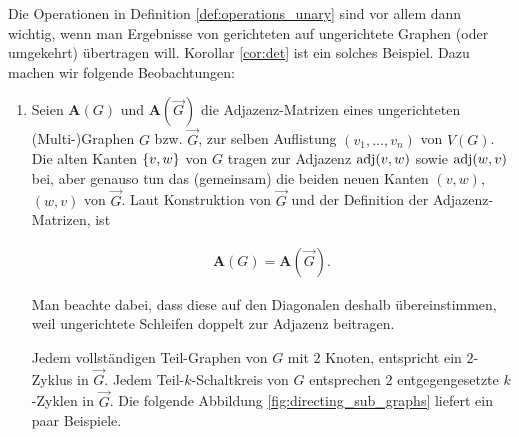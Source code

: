         \begin{remark} \label{rem:operations_unary}

            Die Operationen in Definition \ref{def:operations_unary} sind vor allem dann wichtig, wenn man Ergebnisse von gerichteten auf ungerichtete Graphen (oder umgekehrt) übertragen will.
            Korollar \ref{cor:det} ist ein solches Beispiel.
            Dazu machen wir folgende Beobachtungen:

            \begin{enumerate}[
                label = \texttt{ad} \arabic*.,
                wide,
                labelindent = 0pt
            ]

                \item Seien $\mathbf A(G)$ und $\mathbf A(\vec G)$ die Adjazenz-Matrizen eines ungerichteten (Multi-)Graphen $G$ bzw. $\vec G$, zur selben Auflistung $(v_1, \dots, v_n)$ von $V(G)$.
                Die alten Kanten ${\left \{ v, w \right \}}$ von $G$ tragen zur Adjazenz $\operatorname{adj}(v, w)$ sowie $\operatorname{adj}(w, v)$ bei, aber genauso tun das (gemeinsam) die beiden neuen Kanten $(v, w)$, $(w, v)$ von $\vec G$.
                Laut Konstruktion von $\vec G$ und der Definition der Adjazenz-Matrizen, ist

                \begin{align*}
                    \mathbf A(G) = \mathbf A(\vec G).
                \end{align*}

                Man beachte dabei, dass diese auf den Diagonalen deshalb übereinstimmen, weil ungerichtete Schleifen doppelt zur Adjazenz beitragen.

                Jedem vollständigen Teil-Graphen von $G$ mit $2$ Knoten, entspricht ein $2$-Zyklus in $\vec G$.
                Jedem Teil-$k$-Schaltkreis von $G$ entsprechen $2$ entgegengesetzte $k$-Zyklen in $\vec G$.
                Die folgende Abbildung \ref{fig:directing_sub_graphs} liefert ein paar Beispiele.

                \begin{figure}[h!]
                    \centering
\end{figure}
\end{enumerate}
\end{remark}
